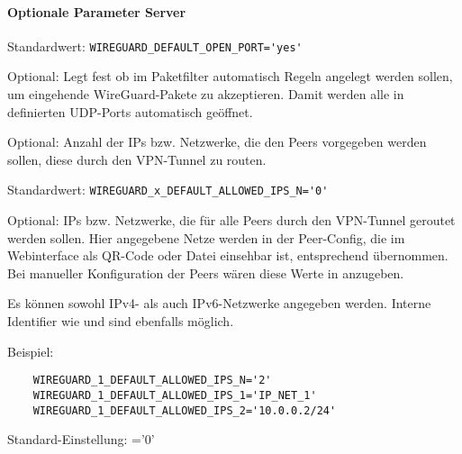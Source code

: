 \paragraph{Optionale Parameter Server}

\begin{description}



Standardwert: \verb+WIREGUARD_DEFAULT_OPEN_PORT='yes'+

Optional: Legt fest ob im Paketfilter automatisch Regeln angelegt werden sollen, um eingehende
WireGuard-Pakete zu akzeptieren. Damit werden alle in  definierten 
UDP-Ports automatisch geöffnet.



Optional: Anzahl der IPs bzw. Netzwerke, die den Peers vorgegeben werden sollen, diese durch den VPN-Tunnel zu routen.

Standardwert: \verb+WIREGUARD_x_DEFAULT_ALLOWED_IPS_N='0'+



Optional: IPs bzw. Netzwerke, die für alle Peers durch den VPN-Tunnel
geroutet werden sollen. Hier angegebene Netze werden in der
Peer-Config, die im Webinterface als QR-Code oder Datei einsehbar ist,
entsprechend übernommen. Bei manueller Konfiguration der Peers wären
diese Werte in  anzugeben.

Es können sowohl IPv4- als auch IPv6-Netzwerke angegeben werden. Interne Identifier wie  und
 sind ebenfalls möglich.

Beispiel:

\begin{example}
\begin{verbatim}
    WIREGUARD_1_DEFAULT_ALLOWED_IPS_N='2'
    WIREGUARD_1_DEFAULT_ALLOWED_IPS_1='IP_NET_1'
    WIREGUARD_1_DEFAULT_ALLOWED_IPS_2='10.0.0.2/24'
\end{verbatim}
\end{example}



Standard-Einstellung: ='0'


\end{description}
